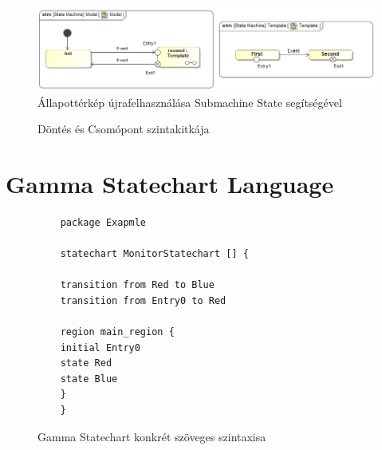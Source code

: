 \begin{figure}[!ht]
	\centering
	\includegraphics[keepaspectratio, width=150mm]{figures/statechart_elements/SubmachineState.png}
	\caption{Állapottérkép újrafelhasználása Submachine State segítségével}
\end{figure}

\begin{figure}[!ht]
	\centering
	\vspace{1cm}	
	\caption{Döntés és Csomópont szintakitkája}
\end{figure}

\clearpage\section{Gamma Statechart Language}

\begin{figure}[!ht]
	\begin{lstlisting}
	package Exapmle
	
	statechart MonitorStatechart [] {
	
	transition from Red to Blue
	transition from Entry0 to Red
	
	region main_region {
	initial Entry0
	state Red
	state Blue
	}
	}
	\end{lstlisting}
	\caption{Gamma Statechart konkrét szöveges szintaxisa}
\end{figure}


